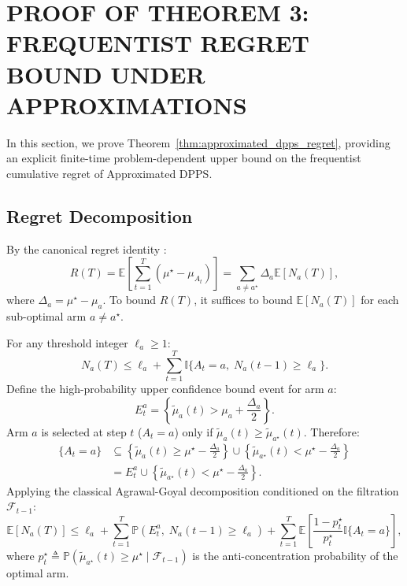 \documentclass[twoside]{article}
\begin{document}
\section{PROOF OF THEOREM 3: FREQUENTIST REGRET BOUND UNDER APPROXIMATIONS}
\label{app:proof_thm3}

In this section, we prove Theorem~\ref{thm:approximated_dpps_regret}, providing an explicit finite-time problem-dependent upper bound on the frequentist cumulative regret of Approximated DPPS.

\subsection{Regret Decomposition}
By the canonical regret identity \citep{lattimore2020bandit}:
\begin{equation}
R(T) = \mathbb{E}\left[ \sum_{t=1}^T (\mu^\star - \mu_{A_t}) \right] = \sum_{a \ne a^\star} \Delta_a \mathbb{E}[N_a(T)],
\end{equation}
where $\Delta_a = \mu^\star - \mu_a$. To bound $R(T)$, it suffices to bound $\mathbb{E}[N_a(T)]$ for each sub-optimal arm $a \ne a^\star$.

For any threshold integer $\ell_a \ge 1$:
\begin{equation}
N_a(T) \le \ell_a + \sum_{t=1}^T \mathbb{I}\{A_t = a, \; N_a(t-1) \ge \ell_a\}.
\end{equation}
Define the high-probability upper confidence bound event for arm $a$:
\begin{equation}
E_t^a = \left\{ \tilde{\mu}_a(t) > \mu_a + \frac{\Delta_a}{2} \right\}.
\end{equation}
Arm $a$ is selected at step $t$ ($A_t = a$) only if $\tilde{\mu}_a(t) \ge \tilde{\mu}_{a^\star}(t)$. Therefore:
\begin{align}
\{A_t = a\} &\subseteq \left\{ \tilde{\mu}_a(t) \ge \mu^\star - \frac{\Delta_a}{2} \right\} \cup \left\{ \tilde{\mu}_{a^\star}(t) < \mu^\star - \frac{\Delta_a}{2} \right\} \nonumber \\
&= E_t^a \cup \left\{ \tilde{\mu}_{a^\star}(t) < \mu^\star - \frac{\Delta_a}{2} \right\}.
\end{align}
Applying the classical Agrawal-Goyal decomposition conditioned on the filtration $\mathcal{F}_{t-1}$:
\begin{equation}
\mathbb{E}[N_a(T)] \le \ell_a + \sum_{t=1}^T \mathbb{P}\left( E_t^a, \; N_a(t-1) \ge \ell_a \right) + \sum_{t=1}^T \mathbb{E}\left[ \frac{1 - p_t^\star}{p_t^\star} \mathbb{I}\{A_t = a\} \right],
\label{eq:canonical_regret_decomp}
\end{equation}
where $p_t^\star \triangleq \mathbb{P}\left( \tilde{\mu}_{a^\star}(t) \ge \mu^\star \mid \mathcal{F}_{t-1} \right)$ is the anti-concentration probability of the optimal arm.
\end{document}
